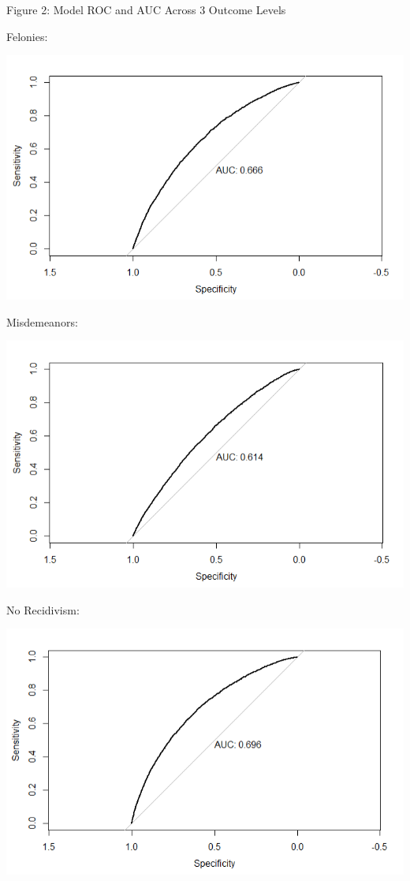 \documentclass{article}
\begin{document}
\pagebreak
\begin{center}
Figure 2: Model ROC and AUC Across 3 Outcome Levels
\end{center}
Felonies:
\begin{center}
\includegraphics[scale=0.45]{felony.PNG}
\end{center}

Misdemeanors:
\begin{center}
\includegraphics[scale=0.45]{misd.PNG}
\end{center}

No Recidivism:
\begin{center}
\includegraphics[scale=0.45]{norecid.PNG}
\end{center}
\pagebreak
\end{document}

